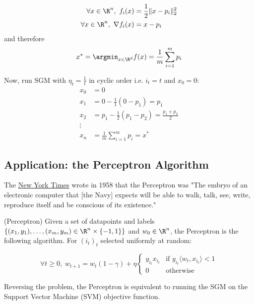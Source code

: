 \begin{align*}
    \forall x \in \R^n,\ f_i(x) &= \frac{1}{2}\|x-p_i\|_2^2 \\
    \forall x \in \R^n,\ \nabla f_i(x) &= x-p_i
\end{align*}
and therefore 
\begin{equation*}
    x^* = \argmin_{x\in\R^d} f(x) = \frac{1}{m}\sum_{i=1}^mp_i
\end{equation*}

Now, run SGM with $\eta_t=\frac{1}{t}$ in cyclic order i.e. $i_t = t$ and $x_0=0$:
\begin{align*}
    x_0 &= 0 \\
    x_1 &= 0 - \frac{1}{1}(0-p_1) = p_1 \\
    x_2 &= p_1 - \frac{1}{2}(p_1-p_2) = \frac{p_1+p_2}{2}\\
    \vdots\\
    x_n &= \frac{1}{m}\sum_{i=1}^mp_i = x^*
\end{align*}

\subsection{Application: the Perceptron Algorithm}


The \href{https://www.nytimes.com/1958/07/08/archives/new-navy-device-learns-by-doing-psychologist-shows-embryo-of.html}{New York Times} wrote in 1958 that the Perceptron \cite{Rosenblatt58theperceptron:} was "The embryo of an electronic computer that [the Navy] expects will be able to walk, talk, see, write, reproduce itself and be conscious of its existence."

\begin{definition}
(Perceptron) Given a set of datapoints and labels $\{(x_1, y_1),\dots,(x_m,y_m)\in \R^n\times \{-1,1\}\}$ and $w_0\in\R^n$, the Perceptron is the following algorithm. For $(i_t)_t$ selected uniformly at random:

\begin{equation*}
    \forall t\geq0,\; w_{t+1} =w_t(1-\gamma) + \eta \begin{cases}
    y_{i_t}x_{i_t}& \text{if } y_{i_t}\langle w_t, x_{i_t}\rangle <1\\
    0              & \text{otherwise}
\end{cases}
\end{equation*}
\end{definition}

Reversing the problem, the Perceptron is equivalent to running the SGM on the Support Vector Machine (SVM) objective function.

